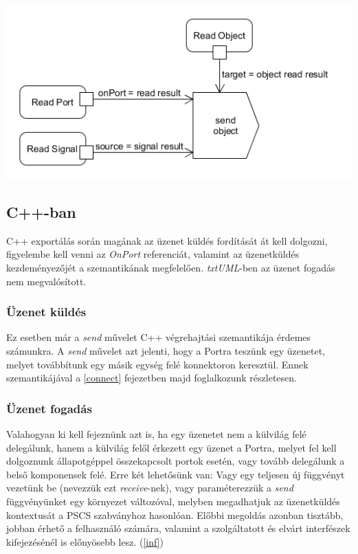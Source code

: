 \documentclass[a4paper,12pt]{report}
\begin{document}
\includegraphics[scale=0.6]{receive_uml.png}

\subsection{C++-ban}
C++ exportálás során magának az üzenet küldés fordítását át kell dolgozni, figyelembe kell venni az \textit{OnPort} referenciát, valamint az üzenetküldés kezdeményezőjét a szemantikának megfelelően. \textit{txtUML}-ben az üzenet fogadás nem megvalósított.

\subsubsection{Üzenet küldés}
Ez esetben már a \textit{send} művelet C++ végrehajtási szemantikája érdemes számunkra. A \textit{send} művelet azt jelenti, hogy a Portra teszünk egy üzenetet, melyet továbbítunk egy másik egység felé konnektoron keresztül. Ennek szemantikájával a \ref{connect} fejezetben majd foglalkozunk részletesen.

\subsubsection{Üzenet fogadás}
Valahogyan ki kell fejeznünk azt is, ha egy üzenetet nem a külvilág felé delegálunk, hanem a külvilág felől érkezett egy üzenet a Portra, melyet fel kell dolgoznunk állapotgéppel összekapcsolt portok esetén, vagy tovább delegálunk a belső komponensek felé. Erre két lehetősünk van: Vagy egy teljesen új függvényt vezetünk be (nevezzük ezt \textit{receive}-nek), vagy paraméterezzük a \textit{send} függvényünket egy környezet változóval, melyben megadhatjuk az üzenetküldés kontextusát a PSCS szabványhoz hasonlóan. Előbbi megoldás azonban tisztább, jobban érhető a felhasználó számára, valamint a szolgáltatott és elvárt interfészek kifejezésénél is előnyösebb lesz. (\ref{inf}) \\
\end{document}
